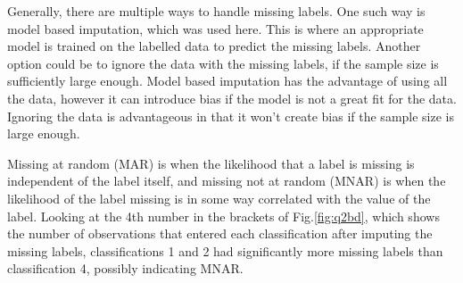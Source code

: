     Generally, there are multiple ways to handle missing labels.
    One such way is model based imputation, which was used here.
    This is where an appropriate model is trained on the labelled data to predict the missing labels.
    Another option could be to ignore the data with the missing labels, if the sample size is sufficiently large enough.
    Model based imputation has the advantage of using all the data, however it can introduce bias if the model is not
    a great fit for the data.
    Ignoring the data is advantageous in that it won't create bias if the sample size is large enough.

    Missing at random (MAR) is when the likelihood that a label is missing is independent of the label itself, and
    missing not at random (MNAR) is when the likelihood of the label missing is in some way correlated with the value
    of the label.
    Looking at the 4th number in the brackets of Fig.\eqref{fig:q2bd}, which shows the number of observations that
    entered each classification after imputing the missing labels, classifications 1 and 2 had significantly more
    missing labels than classification 4, possibly indicating MNAR.
